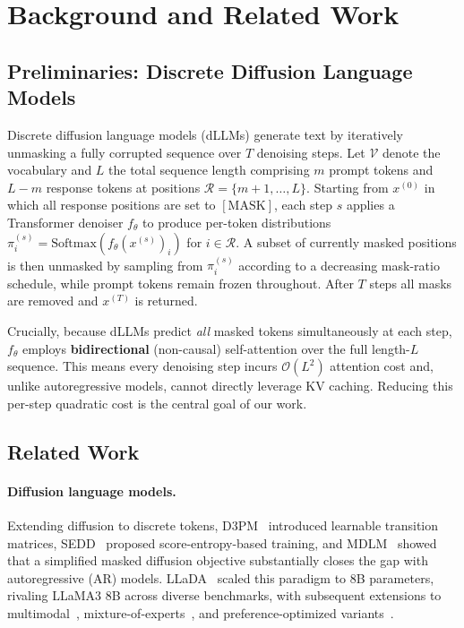 \section{Background and Related Work}
\label{sec:background}

\subsection{Preliminaries: Discrete Diffusion Language Models}
\label{sec:prelim}

Discrete diffusion language models (dLLMs) generate text by iteratively unmasking a fully corrupted sequence over $T$ denoising steps. Let $\mathcal{V}$ denote the vocabulary and $L$ the total sequence length comprising $m$ prompt tokens and $L-m$ response tokens at positions $\mathcal{R}=\{m{+}1,\ldots,L\}$. Starting from $x^{(0)}$ in which all response positions are set to $[\mathrm{MASK}]$, each step $s$ applies a Transformer denoiser $f_\theta$ to produce per-token distributions $\pi_i^{(s)}=\mathrm{Softmax}(f_\theta(x^{(s)})_i)$ for $i\in\mathcal{R}$. A subset of currently masked positions is then unmasked by sampling from $\pi_i^{(s)}$ according to a decreasing mask-ratio schedule, while prompt tokens remain frozen throughout. After $T$ steps all masks are removed and $x^{(T)}$ is returned.

Crucially, because dLLMs predict \emph{all} masked tokens simultaneously at each step, $f_\theta$ employs \textbf{bidirectional} (non-causal) self-attention over the full length-$L$ sequence. This means every denoising step incurs $\mathcal{O}(L^2)$ attention cost and, unlike autoregressive models, cannot directly leverage KV caching. Reducing this per-step quadratic cost is the central goal of our work.

\subsection{Related Work}
\label{sec:related}

\paragraph{Diffusion language models.}
Extending diffusion to discrete tokens, D3PM~\citep{austin2021d3pm} introduced learnable transition matrices, SEDD~\citep{lou2024sedd} proposed score-entropy-based training, and MDLM~\citep{sahoo2024mdlm} showed that a simplified masked diffusion objective substantially closes the gap with autoregressive (AR) models. LLaDA~\citep{nie2025llada} scaled this paradigm to 8B parameters, rivaling LLaMA3 8B across diverse benchmarks, with subsequent extensions to multimodal~\citep{you2025lladav}, mixture-of-experts~\citep{llada-moe2025}, and preference-optimized variants~\citep{zhu2025llada15}.

